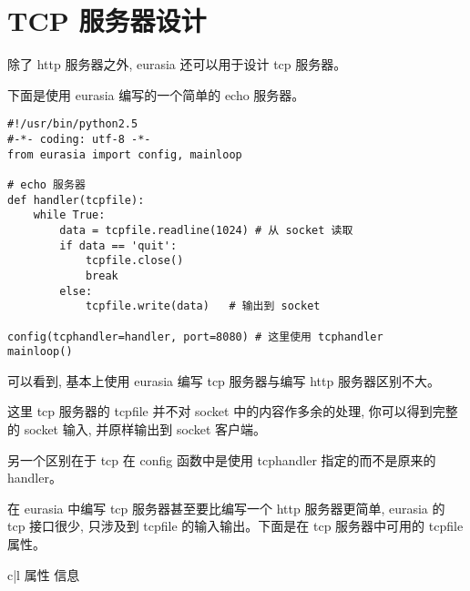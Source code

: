 \documentclass{manual}
\begin{document}


\section{TCP 服务器设计}

除了 http 服务器之外, eurasia 还可以用于设计 tcp 服务器。

下面是使用 eurasia 编写的一个简单的 echo 服务器。

\begin{verbatim}
#!/usr/bin/python2.5
#-*- coding: utf-8 -*-
from eurasia import config, mainloop

# echo 服务器
def handler(tcpfile):
	while True:
		data = tcpfile.readline(1024) # 从 socket 读取
		if data == 'quit':
			tcpfile.close()
			break
		else:
			tcpfile.write(data)   # 输出到 socket

config(tcphandler=handler, port=8080) # 这里使用 tcphandler
mainloop()
\end{verbatim}

可以看到, 基本上使用 eurasia 编写 tcp 服务器与编写 http 服务器区别不大。

这里 tcp 服务器的 tcpfile 并不对 socket 中的内容作多余的处理,
你可以得到完整的 socket 输入, 并原样输出到 socket 客户端。

另一个区别在于 tcp 在 config 函数中是使用 tcphandler 指定的而不是原来的 handler。

在 eurasia 中编写 tcp 服务器甚至要比编写一个 http 服务器更简单,
eurasia 的 tcp 接口很少, 只涉及到 tcpfile 的输入输出。下面是在 tcp 服务器中可用的 tcpfile 属性。

\begin{tableii}{c|l}{}{ 属性 }{ 信息 }
\end{tableii}
\end{document}
